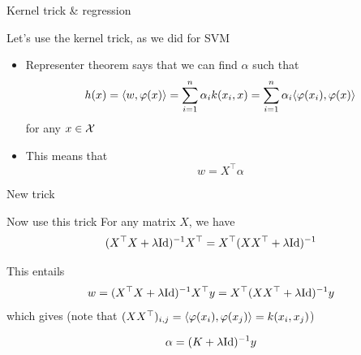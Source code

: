 \documentclass[xcolor={usenames,dvipsnames}]{beamer}
\begin{document}
  
  \begin{frame}{Kernel trick \& regression}
  
Let's use the kernel trick, as we did for SVM


  \begin{itemize}
    \item Representer theorem says that we can find $\alpha$ such that
    \begin{equation*}
      h(x) = \langle w, \varphi(x) \rangle = \sum_{i=1}^n \alpha_i k(x_i, x) = 
      \sum_{i=1}^n \alpha_i \langle \varphi(x_i), \varphi(x) \rangle
    \end{equation*}
    for any $x \in {\mathcal{X}}$
    \item This means that
    \begin{equation*}
      w = X^\top \alpha
    \end{equation*}
  \end{itemize}
  
  \end{frame}


\begin{frame}{New trick}
\begin{block}{Now use this trick}
 For any matrix $X$, we have
  \begin{equation*}
    (X^\top X + \lambda \mathrm{Id})^{-1} X^\top = X^\top (X X^\top 
    + \lambda \mathrm{Id})^{-1}
  \end{equation*}
  \end{block}
  
  This entails
  \begin{equation*}
    w = (X^\top X + \lambda \mathrm{Id})^{-1} X^\top y = X^\top (X X^\top 
    + \lambda \mathrm{Id})^{-1}  y 
  \end{equation*}
  which gives (note that $(X X^\top)_{i, j} = \langle \varphi(x_i), \varphi(x_j) \rangle = 
  k(x_i, x_j)$)
  
  \begin{block}{}
  \begin{equation*}
    \alpha = ( K + \lambda \mathrm{Id})^{-1} y
  \end{equation*}
  \end{block}
  \end{frame}
  
\end{document}
